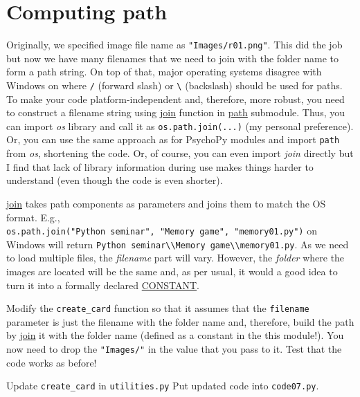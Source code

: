 \documentclass[
]{book}
\begin{document}
\hypertarget{os-library}{%
\section{Computing path}\label{os-library}}

Originally, we specified image file name as \texttt{"Images/r01.png"}. This did the job but now we have many filenames that we need to join with the folder name to form a path string. On top of that, major operating systems disagree with Windows on where \texttt{/} (forward slash) or \texttt{\textbackslash{}} (backslash) should be used for paths. To make your code platform-independent and, therefore, more robust, you need to construct a filename string using \href{https://docs.python.org/3/library/os.path.html\#os.path.join}{join} function in \href{https://docs.python.org/3/library/os.path.html}{path} submodule. Thus, you can import \emph{os} library and call it as \texttt{os.path.join(...)} (my personal preference). Or, you can use the same approach as for PsychoPy modules and import \texttt{path} from \emph{os}, shortening the code. Or, of course, you can even import \emph{join} directly but I find that lack of library information during use makes things harder to understand (even though the code is even shorter).

\href{https://docs.python.org/3/library/os.path.html\#os.path.join}{join} takes path components as parameters and joins them to match the OS format. E.g., \texttt{os.path.join("Python\ seminar",\ "Memory\ game",\ "memory01.py")} on Windows will return \texttt{\textquotesingle{}Python\ seminar\textbackslash{}\textbackslash{}Memory\ game\textbackslash{}\textbackslash{}memory01.py\textquotesingle{}}. As we need to load multiple files, the \emph{filename} part will vary. However, the \emph{folder} where the images are located will be the same and, as per usual, it would a good idea to turn it into a formally declared \protect\hyperlink{constants}{CONSTANT}.

Modify the \texttt{create\_card} function so that it assumes that the \texttt{filename} parameter is just the filename with the folder name and, therefore, build the path by \href{https://docs.python.org/3/library/os.path.html\#os.path.join}{join} it with the folder name (defined as a constant in the this module!). You now need to drop the \texttt{"Images/"} in the value that you pass to it. Test that the code works as before!

Update \texttt{create\_card} in \texttt{utilities.py}
Put updated code into \texttt{code07.py}.
\end{document}
